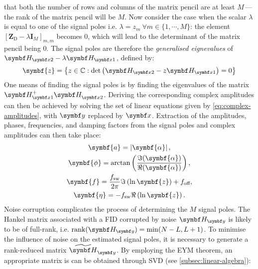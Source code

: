 that both the number of rows and columns of the matrix pencil are at least
$M$\,---\,the rank of the matrix pencil will be $M$.
Now consider the case when the scalar $\lambda$ is
equal to one of the signal poles i.e.  $\lambda = z_m\ \forall m \in
\lbrace 1, \cdots, M \rbrace$: the element $[\symbf{Z}_{\text{D}} -
\lambda \symbf{I}_M]_{m,m}$ becomes $0$, which will lead to the
determinant of the matrix pencil being $0$. The signal poles are therefore the
\emph{generalised eignevalues} of $\Hxtwo - \lambda \Hxone$, defined
by\cite[Section 7.7]{Golub2013}:
\begin{equation}
    \symbf{z} = \left\lbrace
        z \in \mathbb{C} : \det\left(\Hxtwo - z \Hxone\right) = 0
    \right\rbrace
\end{equation}
One means of finding the signal poles is by finding the eigenvalues of the
matrix $\Hxone^+ \Hxtwo^{\vphantom{+}}$. Deriving the corresponding complex
amplitudes can then be achieved by solving the set of linear equations given by
\cref{eq:complex-amplitudes}, with $\by$ replaced by $\bx$.
Extraction of the amplitudes, phases, frequencies, and damping factors from the
signal poles and complex amplitudes can then take place:%
\begin{subequations}%
    \begin{gather}
        \symbf{a} = \left \lvert \symbf{\alpha} \right \rvert,\\
        \symbf{\phi} = \arctan \left(\frac{\Im (\symbf{\alpha})}{\Re(\symbf{\alpha})}\right),\\
        \symbf{f} = \frac{\fsw}{2 \pi} \Im\left(\ln \symbf{z} \right) + \foff,\label{eq:poles-to-f}\\
        \symbf{\eta} = -\fsw \Re\left(\ln \symbf{z}\right).
    \end{gather}
\end{subequations}
Noise corruption complicates the process of
determining the $M$ signal poles. The Hankel matrix associated with a
\ac{FID} corrupted by noise $\Hy$ is likely to be of full-rank, i.e.
$\rank(\Hy) = \min(N - L, L + 1)$. To minimise the influence of noise on
the estimated signal poles, it is necessary to
generate a rank-reduced matrix $\Hytilde$. By employing the \ac{EYM}
theorem\cite[Section~2.2]{Golub2013}, an appropriate matrix is can be obtained
through \ac{SVD} (see \cref{subsec:linear-algebra}):
